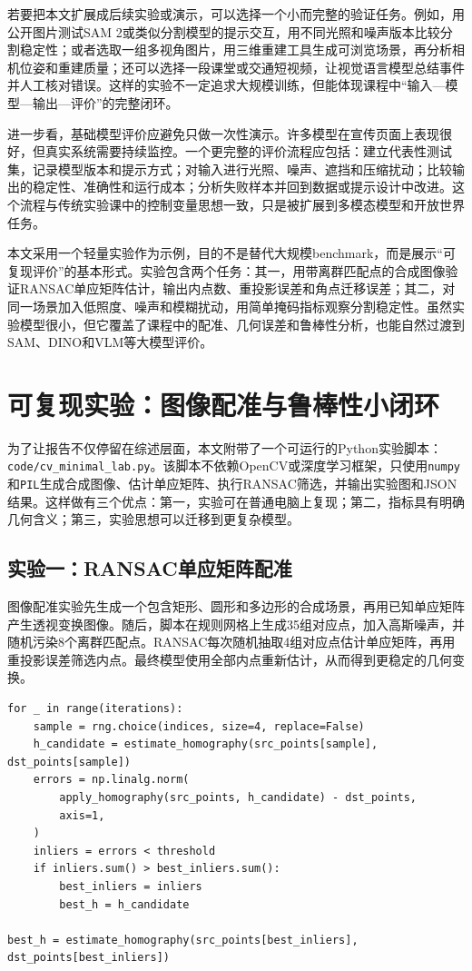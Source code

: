 \documentclass[UTF8,a4paper,12pt]{ctexart}
\newcommand{\model}[1]{\textsf{#1}}
\begin{document}
若要把本文扩展成后续实验或演示，可以选择一个小而完整的验证任务。例如，用公开图片测试\model{SAM 2}或类似分割模型的提示交互，用不同光照和噪声版本比较分割稳定性；或者选取一组多视角图片，用三维重建工具生成可浏览场景，再分析相机位姿和重建质量；还可以选择一段课堂或交通短视频，让视觉语言模型总结事件并人工核对错误。这样的实验不一定追求大规模训练，但能体现课程中“输入—模型—输出—评价”的完整闭环。

进一步看，基础模型评价应避免只做一次性演示。许多模型在宣传页面上表现很好，但真实系统需要持续监控。一个更完整的评价流程应包括：建立代表性测试集，记录模型版本和提示方式；对输入进行光照、噪声、遮挡和压缩扰动；比较输出的稳定性、准确性和运行成本；分析失败样本并回到数据或提示设计中改进。这个流程与传统实验课中的控制变量思想一致，只是被扩展到多模态模型和开放世界任务。

本文采用一个轻量实验作为示例，目的不是替代大规模benchmark，而是展示“可复现评价”的基本形式。实验包含两个任务：其一，用带离群匹配点的合成图像验证RANSAC单应矩阵估计，输出内点数、重投影误差和角点迁移误差；其二，对同一场景加入低照度、噪声和模糊扰动，用简单掩码指标观察分割稳定性。虽然实验模型很小，但它覆盖了课程中的配准、几何误差和鲁棒性分析，也能自然过渡到SAM、DINO和VLM等大模型评价。

\section{可复现实验：图像配准与鲁棒性小闭环}
为了让报告不仅停留在综述层面，本文附带了一个可运行的Python实验脚本：\texttt{code/cv\_minimal\_lab.py}。该脚本不依赖OpenCV或深度学习框架，只使用\texttt{numpy}和\texttt{PIL}生成合成图像、估计单应矩阵、执行RANSAC筛选，并输出实验图和JSON结果。这样做有三个优点：第一，实验可在普通电脑上复现；第二，指标具有明确几何含义；第三，实验思想可以迁移到更复杂模型。

\subsection{实验一：RANSAC单应矩阵配准}
图像配准实验先生成一个包含矩形、圆形和多边形的合成场景，再用已知单应矩阵产生透视变换图像。随后，脚本在规则网格上生成35组对应点，加入高斯噪声，并随机污染8个离群匹配点。RANSAC每次随机抽取4组对应点估计单应矩阵，再用重投影误差筛选内点。最终模型使用全部内点重新估计，从而得到更稳定的几何变换。

\begin{lstlisting}[caption={RANSAC单应矩阵估计核心代码摘录},label={lst:ransac}]
for _ in range(iterations):
    sample = rng.choice(indices, size=4, replace=False)
    h_candidate = estimate_homography(src_points[sample], dst_points[sample])
    errors = np.linalg.norm(
        apply_homography(src_points, h_candidate) - dst_points,
        axis=1,
    )
    inliers = errors < threshold
    if inliers.sum() > best_inliers.sum():
        best_inliers = inliers
        best_h = h_candidate

best_h = estimate_homography(src_points[best_inliers], dst_points[best_inliers])
\end{lstlisting}
\end{document}
